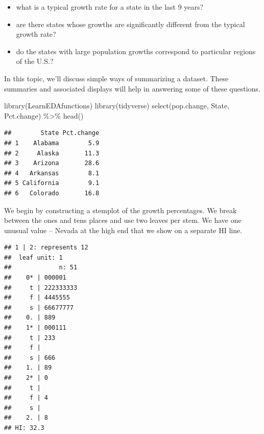 \documentclass[
]{book}
\newenvironment{Shaded}{\begin{snugshade}}{\end{snugshade}}
\newcommand{\AttributeTok}[1]{\textcolor[rgb]{0.77,0.63,0.00}{#1}}
\newcommand{\ConstantTok}[1]{\textcolor[rgb]{0.00,0.00,0.00}{#1}}
\newcommand{\FunctionTok}[1]{\textcolor[rgb]{0.00,0.00,0.00}{#1}}
\newcommand{\NormalTok}[1]{#1}
\newcommand{\SpecialCharTok}[1]{\textcolor[rgb]{0.00,0.00,0.00}{#1}}
\providecommand{\tightlist}{%
  \setlength{\itemsep}{0pt}\setlength{\parskip}{0pt}}
\begin{document}
\begin{itemize}
\tightlist
\item
  what is a typical growth rate for a state in the last 9 years?
\item
  are there states whose growths are significantly different from the typical growth rate?
\item
  do the states with large population growths correspond to particular regions of the U.S.?
\end{itemize}

In this topic, we'll discuss simple ways of summarizing a dataset. These summaries and associated displays will help in answering some of these questions.

\begin{Shaded}
\begin{Highlighting}[]
\FunctionTok{library}\NormalTok{(LearnEDAfunctions)}
\FunctionTok{library}\NormalTok{(tidyverse)}
\FunctionTok{select}\NormalTok{(pop.change, State, Pct.change) }\SpecialCharTok{\%\textgreater{}\%} \FunctionTok{head}\NormalTok{()}
\end{Highlighting}
\end{Shaded}

\begin{verbatim}
##        State Pct.change
## 1    Alabama        5.9
## 2     Alaska       11.3
## 3    Arizona       28.6
## 4   Arkansas        8.1
## 5 California        9.1
## 6   Colorado       16.8
\end{verbatim}

We begin by constructing a stemplot of the growth percentages. We break between the ones and tens places and use two leaves per stem. We have one unusual value -- Nevada at the high end that we show on a separate HI line.

\begin{Shaded}
\end{Shaded}

\begin{verbatim}
## 1 | 2: represents 12
##  leaf unit: 1
##             n: 51
##    0* | 000001
##     t | 222333333
##     f | 4445555
##     s | 66677777
##    0. | 889
##    1* | 000111
##     t | 233
##     f | 
##     s | 666
##    1. | 89
##    2* | 0
##     t | 
##     f | 4
##     s | 
##    2. | 8
## HI: 32.3
\end{verbatim}
\end{document}
